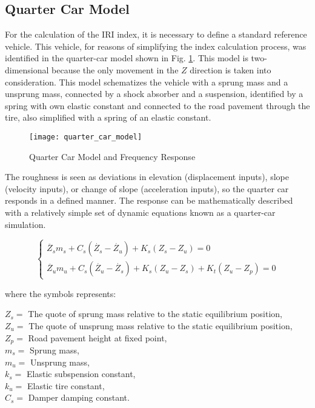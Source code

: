 \documentclass[tesi]{subfiles}
\begin{document}
\subsection{Quarter Car Model}\label{ssc:Quarter Car Model}
For the calculation of the IRI index, it is necessary to define a standard reference vehicle\cite{little_book}. This vehicle, for reasons of simplifying the index calculation process, was identified in the quarter-car model shown in Fig. \ref{fig:Quarter Car Model}. This model is two-dimensional because the only
movement in the $Z$ direction is taken into consideration. This model schematizes the vehicle with a sprung mass and a unsprung mass, connected by a shock absorber and a suspension, identified by a spring with own elastic constant and connected to the road pavement through the tire, also simplified with a spring of an elastic constant\cite{little_book}.

\begin{figure}[H]
\centering
\texttt{[image: quarter\_car\_model]}
\caption{Quarter Car Model and Frequency Response}

\label{fig:Quarter Car Model}
\end{figure}

The roughness is seen as deviations in elevation\cite{gillespie1992everything} (displacement inputs), slope (velocity inputs), or change of slope (acceleration inputs), so the quarter car responds in a defined manner. The response can be mathematically described with a relatively simple set
of dynamic equations known as a quarter-car simulation.


\begin{center}

\[
    \left\{
                \begin{array}{ll}
                  \ddot{Z_{s}} m_{s} + C_{s} ( \dot{Z_{s}} - \dot{Z_{u}} ) + K_{s} (Z_{s} - Z_{u}) = 0\\
                   \ddot{Z_{u}} m_{u} + C_{s} ( \dot{Z_{u}} - \dot{Z_{s}}) + K_{s} (Z_{u} - Z_{s}) + K_{t} ( Z_{u} - Z_{p} ) = 0
                \end{array}
              \right.
\]




\end{center}

where the symbols represents:


$ Z_{s} =  $ The quote of sprung mass relative to the static equilibrium position,	\\
$ Z_{u} =  $ The quote of unsprung mass relative to the static equilibrium position,\\
$ Z_{p} = $ Road pavement height at fixed point,\\
$ m_{s} = $ Sprung mass,	\\
$ m_{u} = $ Unsprung mass, \\
$ k_{s} = $ Elastic subspension constant, \\
$ k_{u} = $ Elastic tire constant, \\
$C_{s} = $ Damper damping constant.\\
\end{document}
